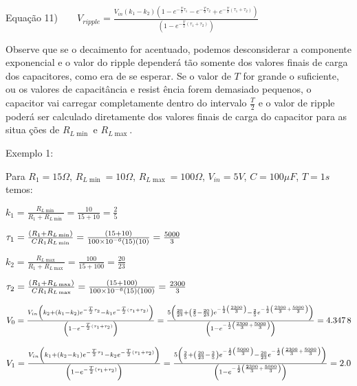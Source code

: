 \documentclass{article}
\begin{document}
Equa\c{c}\~{a}o 11)$\qquad V_{ripple}=\frac{V_{in}\left( k_{1}-k_{2}\right)
\left( 1-e^{-\frac{T}{2}\tau _{1}}-e^{-\frac{T}{2}\tau _{2}}+e^{-\frac{T}{2}%
\left( \tau _{1}+\tau _{2}\right) }\right) }{\left( 1-e^{-\frac{T}{2}\left(
\tau _{1}+\tau _{2}\right) }\right) }$

\vspace{1pt}

Observe que se o decaimento for acentuado, podemos desconsiderar a
componente exponencial e o valor do ripple depender\'{a} t\~{a}o somente dos
valores finais de carga dos capacitores, como era de se esperar. Se o valor
de $T$ for grande o suficiente, ou os valores de capacit\^{a}ncia e resist%
\^{e}ncia forem demasiado pequenos, o capacitor vai carregar completamente
dentro do intervalo $\frac{T}{2}$ e o valor de ripple poder\'{a} ser
calculado diretamente dos valores finais de carga do capacitor para as situa%
\c{c}\~{o}es de $R_{L\min }$ e $R_{L\max }$.

\vspace{1pt}Exemplo 1:

Para $R_{1}=15\Omega $, $R_{L\min }=10\Omega $, $R_{L\max }=100\Omega $, $%
V_{in}=5V$, $C=100\mu F$, $T=1s$ temos:

$k_{1}=\frac{R_{L\min }}{R_{1}+R_{L\min }}=\frac{10}{15+10}=\allowbreak 
\frac{2}{5}$

$\tau _{1}=\frac{\left( R_{1}+R_{L\min }\right) }{CR_{1}R_{L\min }}=\frac{%
\left( 15+10\right) }{100\times 10^{-6}\left( 15\right) \left( 10\right) }%
=\allowbreak \frac{5000}{3}$

$k_{2}=\frac{R_{L\max }}{R_{1}+R_{L\max }}=\frac{100}{15+100}=\allowbreak 
\frac{20}{23}$

$\tau _{2}=\frac{\left( R_{1}+R_{L\max }\right) }{CR_{1}R_{L\max }}=\frac{%
\left( 15+100\right) }{100\times 10^{-6}\left( 15\right) \left( 100\right) }%
=\allowbreak \frac{2300}{3}$

$V_{0}=\frac{V_{in}\left( k_{2}+\left( k_{1}-k_{2}\right) e^{-\frac{T}{2}%
\tau _{2}}-k_{1}e^{-\frac{T}{2}\left( \tau _{1}+\tau _{2}\right) }\right) }{%
\left( 1-e^{-\frac{T}{2}\left( \tau _{1}+\tau _{2}\right) }\right) }=\frac{%
5\left( \frac{20}{23}+\left( \frac{2}{5}-\frac{20}{23}\right) e^{-\frac{1}{2}%
\left( \frac{2300}{3}\right) }-\frac{2}{5}e^{-\frac{1}{2}\left( \frac{2300}{3%
}+\frac{5000}{3}\right) }\right) }{\left( 1-e^{-\frac{1}{2}\left( \frac{2300%
}{3}+\frac{5000}{3}\right) }\right) }=\allowbreak 4.\allowbreak 347\,8$

$V_{1}=\frac{V_{in}\left( k_{1}+\left( k_{2}-k_{1}\right) e^{-\frac{T}{2}%
\tau _{1}}-k_{2}e^{-\frac{T}{2}\left( \tau _{1}+\tau _{2}\right) }\right) }{%
\left( 1-e^{-\frac{T}{2}\left( \tau _{1}+\tau _{2}\right) }\right) }=\frac{%
5\left( \frac{2}{5}+\left( \frac{20}{23}-\frac{2}{5}\right) e^{-\frac{1}{2}%
\left( \frac{5000}{3}\right) }-\frac{20}{23}e^{-\frac{1}{2}\left( \frac{2300%
}{3}+\frac{5000}{3}\right) }\right) }{\left( 1-e^{-\frac{1}{2}\left( \frac{%
2300}{3}+\frac{5000}{3}\right) }\right) }=\allowbreak 2.0$
\end{document}
